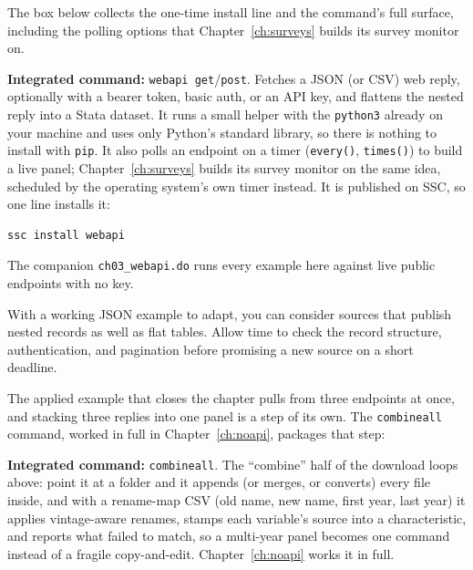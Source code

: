 The box below collects the one-time install line and the command's full surface, including the polling options that Chapter~\ref{ch:surveys} builds its survey monitor on.

\begin{kaobox}[frametitle=Package Integration: \texttt{webapi}]
\textbf{Integrated command:} \texttt{webapi get}/\texttt{post}. Fetches a JSON (or CSV) web reply, optionally with a bearer token, basic auth, or an API key, and flattens the nested reply into a Stata dataset. It runs a small helper with the \texttt{python3} already on your machine and uses only Python's standard library, so there is nothing to install with \texttt{pip}. It also polls an endpoint on a timer (\texttt{every()}, \texttt{times()}) to build a live panel; Chapter~\ref{ch:surveys} builds its survey monitor on the same idea, scheduled by the operating system's own timer instead. It is published on SSC, so one line installs it:
\par
{\footnotesize
\begin{verbatim}
ssc install webapi
\end{verbatim}
}
The companion \texttt{ch03\_webapi.do} runs every example here against live public endpoints with no key.
\end{kaobox}

With a working JSON example to adapt, you can consider sources that publish nested records as well as flat tables. Allow time to check the record structure, authentication, and pagination before promising a new source on a short deadline.

The applied example that closes the chapter pulls from three endpoints at once, and stacking three replies into one panel is a step of its own. The \texttt{combineall} command, worked in full in Chapter~\ref{ch:noapi}, packages that step:

\begin{kaobox}[frametitle=Package Integration: \texttt{combineall}]
\textbf{Integrated command:} \texttt{combineall}. The \enquote{combine} half of the download loops above: point it at a folder and it appends (or merges, or converts) every file inside, and with a rename-map CSV (old name, new name, first year, last year) it applies vintage-aware renames, stamps each variable's source into a characteristic, and reports what failed to match, so a multi-year panel becomes one command instead of a fragile copy-and-edit. Chapter~\ref{ch:noapi} works it in full.
\end{kaobox}

